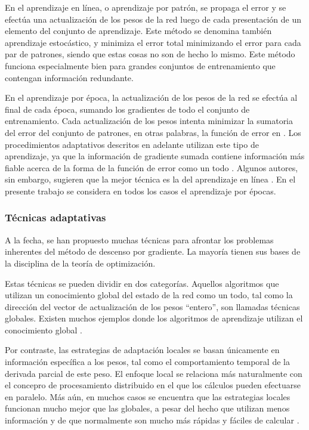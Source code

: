 En el aprendizaje en línea, o aprendizaje por patrón, se
propaga el error y se efectúa una actualización de los pesos de la red
luego de cada
presentación de un elemento del conjunto de aprendizaje.
Este método se denomina también aprendizaje
estocástico, y minimiza el error total
minimizando el error para cada par de patrones, siendo que estas cosas
no son de hecho lo mismo. Este método funciona especialmente bien para
grandes conjuntos de entrenamiento que contengan información
redundante.

En el aprendizaje por época, la actualización de los pesos de la red
se efectúa al final de cada época, 
sumando los gradientes de todo el conjunto de entrenamiento.  Cada
actualización de los pesos intenta minimizar la sumatoria del error
del conjunto de patrones, en otras palabras, la función de error en
. Los procedimientos adaptativos descritos en adelante
utilizan este tipo de aprendizaje, ya que la información de gradiente
sumada contiene información más fiable acerca de la forma de la
función de error como un todo \cite{riedmiller}.  Algunos autores, sin
embargo, sugieren que la mejor técnica es la del aprendizaje en línea
\cite{haykin}.
En el presente trabajo se considera en todos los casos el aprendizaje
por épocas.
%
\subsubsection{Técnicas adaptativas}
%
A la fecha, se han propuesto muchas técnicas para afrontar los
problemas inherentes del método de descenso por gradiente. La mayoría
tienen sus bases de la disciplina de la teoría de
optimización.

Estas técnicas se pueden dividir en dos
categorías. Aquellos algoritmos que utilizan un conocimiento global
del estado de la red como un todo, tal como la dirección del vector de
actualización de los pesos ``entero'', son llamadas técnicas globales.
Existen muchos ejemplos donde los algoritmos de aprendizaje utilizan el
conocimiento global \cite{salomon,moeller}.

Por contraste, las estrategias de adaptación locales se basan
únicamente en información específica a los pesos, tal como el
comportamiento temporal de la derivada parcial de este peso. El
enfoque local se relaciona más naturalmente con el concepro de
procesamiento distribuido en el que los cálculos pueden efectuarse en
paralelo.  Más aún, en muchos casos se encuentra que las estrategias
locales funcionan mucho mejor que las globales, a pesar del hecho que
utilizan menos información y de que normalmente son mucho más rápidas
y fáciles de calcular \cite{schiffmann}.

